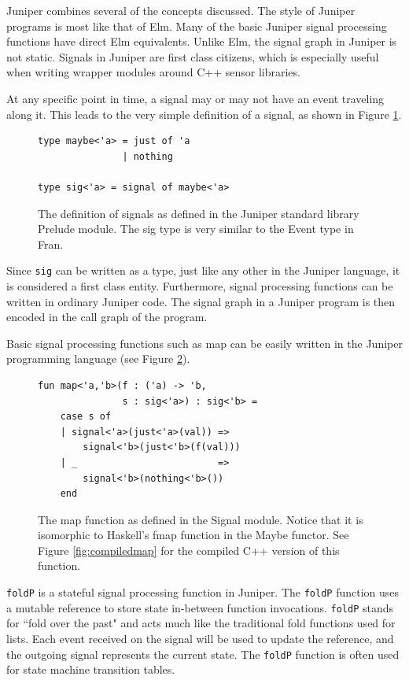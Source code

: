 \documentclass{sigplanconf}
\begin{document}
Juniper combines several of the concepts discussed. The style of Juniper programs is most like that of Elm. Many of the basic Juniper signal processing functions have direct Elm equivalents. Unlike Elm, the signal graph in Juniper is not static. Signals in Juniper are first class citizens, which is especially useful when writing wrapper modules around C++ sensor libraries.

At any specific point in time, a signal may or may not have an event traveling along it. This leads to the very simple definition of a signal, as shown in Figure \ref{fig:sigdef}.
\begin{figure}[h]
\begin{verbatim}
type maybe<'a> = just of 'a
               | nothing

type sig<'a> = signal of maybe<'a>
\end{verbatim}
\caption{The definition of signals as defined in the Juniper standard library Prelude module. The sig type is very similar to the Event type in Fran.}
\label{fig:sigdef}
\end{figure}
Since \texttt{sig} can be written as a type, just like any other in the Juniper language, it is considered a first class entity. Furthermore, signal processing functions can be written in ordinary Juniper code. The signal graph in a Juniper program is then encoded in the call graph of the program.

Basic signal processing functions such as map can be easily written in the Juniper programming language (see Figure \ref{fig:map}).
\begin{figure}
\begin{verbatim}
fun map<'a,'b>(f : ('a) -> 'b,
               s : sig<'a>) : sig<'b> =
    case s of
    | signal<'a>(just<'a>(val)) =>
        signal<'b>(just<'b>(f(val)))
    | _                         =>
        signal<'b>(nothing<'b>())
    end
\end{verbatim}
\caption{The map function as defined in the Signal module. Notice that it is isomorphic to Haskell's fmap function in the Maybe functor. See Figure \ref{fig:compiledmap} for the compiled C++ version of this function.}
\label{fig:map}
\end{figure}

\texttt{foldP} is a stateful signal processing function in Juniper. The \texttt{foldP} function uses a mutable reference to store state in-between function invocations. \texttt{foldP} stands for ``fold over the past" and acts much like the traditional fold functions used for lists. Each event received on the signal will be used to update the reference, and the outgoing signal represents the current state. The \texttt{foldP} function is often used for state machine transition tables.
\end{document}
